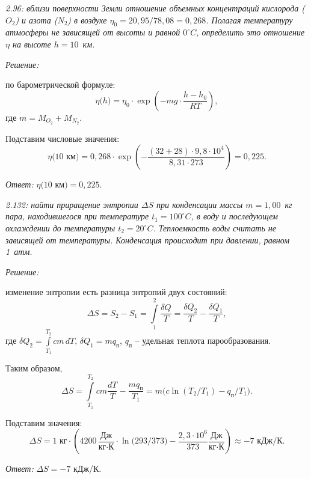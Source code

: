 \documentclass[pscyr]{hedsemwork}
\begin{document}
\newpage %

\emph{2.96: вблизи поверхности Земли отношение объемных концентраций кислорода
(\( O_2 \)) и азота (\( N_2 \)) в воздухе \( \eta_0 = 20,\!95/78,\!08 =
0,\!268 \). Полагая температуру атмосферы не зависящей от высоты и равной
\( 0^\circ C \), определить это отношение \( \eta \) на высоте \( h = 10 \)~км.}

\vspace*{2em}
\emph{Решение:}

по барометрической формуле:
\[
  \eta\big(h\big) = \eta_0\cdot\exp\left(-mg\cdot\frac{h - h_0}{RT}\right),
\]
где \( m = M_{O_2} + M_{N_2} \).

Подставим числовые значения:
\[
  \eta\big(10\text{ км}\big) = 0,\!268\cdot\exp\left(-\frac{(32 + 28)\cdot
  9,\!8\cdot10^{4}}{8,\!31\cdot273}\right) = 0,\!225.
\]

\vspace*{2em}
\emph{Ответ:} \( \eta\big(10\text{ км}\big) = 0,\!225 \).

\newpage %

\emph{2.132: найти приращение энтропии \( \Delta S \) при конденсации массы
\( m = 1,\!00 \)~кг пара, находившегося при температуре \( t_1 = 100^\circ C \),
в воду и последующем охлаждении до температуры \( t_2 = 20^\circ C \).
Теплоемкость воды считать не зависящей от температуры. Конденсация происходит
при давлении, равном 1~атм.}

\vspace*{2em}
\emph{Решение:}

изменение энтропии есть разница энтропий двух состояний:
\[
  \Delta S = S_2 - S_1 = \int\limits_1^2 \frac{\delta Q}{T} =
  \frac{\delta Q_2}{T} - \frac{\delta Q_1}{T},
\]
где \( \displaystyle \delta Q_2 = \int\limits_{T_1}^{T_2} cm\,dT \), \quad
\( \delta Q_1 = mq_\text{п} \), \( q_\text{п} \) -- удельная теплота
парообразования.

Таким образом,
\[
  \Delta S = \int\limits_{T_1}^{T_2} cm\frac{dT}{T} - \frac{mq_\text{п}}{T_1} =
  m\big(c\ln(T_2/T_1) - q_\text{п}/T_1\big).
\]

Подставим значения:
\[
  \Delta S = 1\text{ кг}\cdot
  \left( 4200\,\frac{\text{Дж}}{\text{кг}\cdot\text{К}} \cdot
  \ln\big( 293/373 \big) - \frac{2,\!3\cdot 10^6}{373}
  \frac{\text{Дж}}{\text{кг}\cdot\text{К}} \right)
  \approx -7 \text{ кДж}/\text{К}.
\]

\vspace*{2em}
\emph{Ответ:} \( \Delta S = -7 \) кДж/К.
\end{document}
